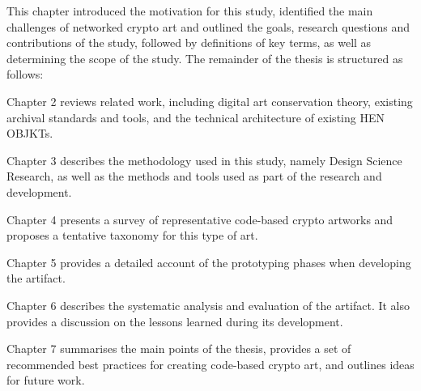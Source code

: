 This chapter introduced the motivation for this study, identified the main challenges of networked crypto art and outlined the goals, research questions and contributions of the study, followed by definitions of key terms, as well as determining the scope of the study. The remainder of the thesis is structured as follows:

Chapter 2 reviews related work, including digital art conservation theory, existing archival standards and tools, and the technical architecture of existing HEN OBJKTs.

Chapter 3 describes the methodology used in this study, namely Design Science Research, as well as the methods and tools used as part of the research and development.

Chapter 4 presents a survey of representative code-based crypto artworks and proposes a tentative taxonomy for this type of art.

Chapter 5 provides a detailed account of the prototyping phases when developing the artifact.

Chapter 6 describes the systematic analysis and evaluation of the artifact. It also provides a discussion on the lessons learned during its development.

Chapter 7 summarises the main points of the thesis, provides a set of recommended best practices for creating code-based crypto art, and outlines ideas for future work.
